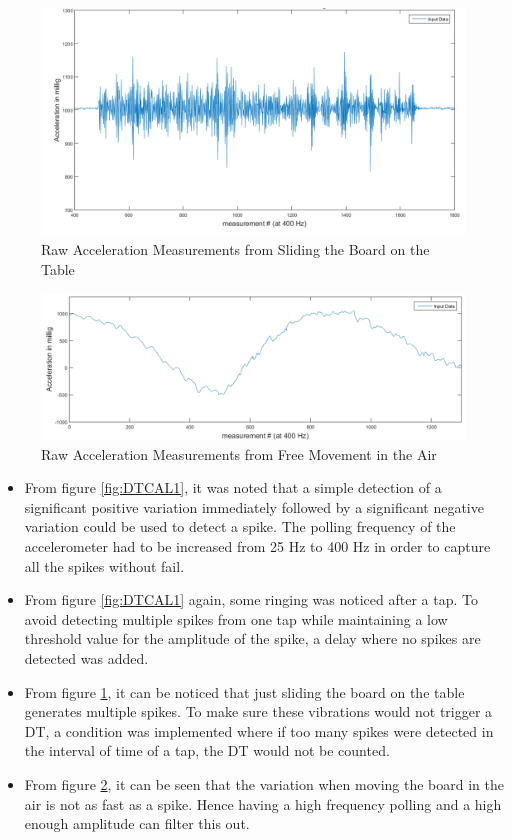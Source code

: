 \documentclass[12pt]{article}
\begin{document}
\begin{figure}[!htb]
 \centering
 \includegraphics[scale=0.45]{images/DTcalibration2.png}
 \caption{Raw Acceleration Measurements from Sliding the Board on the Table}
 \label{fig:DTCAL2}
\end{figure}

\begin{figure}[!htb]
 \centering
 \includegraphics[scale=0.45]{images/DTcalibration3.png}
 \caption{Raw Acceleration Measurements from Free Movement in the Air}
 \label{fig:DTCAL3}
\end{figure}

\begin{itemize}
\item From figure \ref{fig:DTCAL1}, it was noted that a simple detection of a significant positive variation immediately followed by a significant negative variation could be used to detect a spike. The polling frequency of the accelerometer had to be increased from 25 Hz to 400 Hz in order to capture all the spikes without fail.
\item From figure \ref{fig:DTCAL1} again, some ringing was noticed after a tap. To avoid detecting multiple spikes from one tap while maintaining a low threshold value for the amplitude of the spike, a delay where no spikes are detected was added.
\item From figure \ref{fig:DTCAL2},  it can be noticed that just sliding the board on the table generates multiple spikes. To make sure these vibrations would not trigger a DT, a condition was implemented where if too many spikes were detected in the interval of time of a tap, the DT would not be counted.
\item From figure \ref{fig:DTCAL3}, it can be seen that the variation when moving the board in the air is not as fast as a spike. Hence having a high frequency polling and a high enough amplitude can filter this out. 

\end{itemize}
\end{document}
